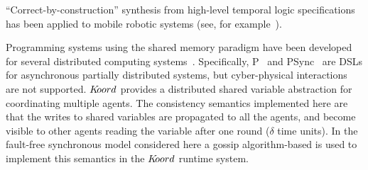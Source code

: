 ``Correct-by-construction'' synthesis from high-level temporal logic specifications has been applied to mobile robotic systems (see, for example~\cite{kress2009temporal,kloetzer2008fully,wongpiromsarn2010receding,wongpiromsarn2011tulip,ulusoy2013optimality}).


%
Programming systems using the  shared memory paradigm have been developed for several distributed computing systems~\cite{dsm1991,Adve96sharedmemory,Azure,Cassandra,Dynamo}.
Specifically, P~\cite{Planguage}  and PSync~\cite{PSyncLanguage} are DSLs for  asynchronous partially  distributed systems, but cyber-physical interactions are not supported. 
$K\kern-2pt oord$  provides a distributed shared variable abstraction for coordinating multiple agents. 
The consistency semantics implemented here are that the writes to shared variables are propagated to all the agents, and become visible to other agents reading the variable after one round ($\delta$ time units).
In the fault-free synchronous model considered here a gossip algorithm-based is used to implement this semantics in the $K\kern-2pt oord$ runtime system. 
%

